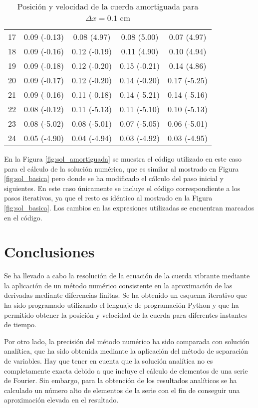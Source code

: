 \documentclass[11pt]{article}
\begin{document}
\begin{table}
\begin{small}
\begin{tabular}{ c c c c c }
17 & 0.09 (-0.13) & 0.08 (4.97) & 0.08 (5.00) & 0.07 (4.97) \\
18 & 0.09 (-0.16) & 0.12 (-0.19) & 0.11 (4.90) & 0.10 (4.94) \\
19 & 0.09 (-0.18) & 0.12 (-0.20) & 0.15 (-0.21) & 0.14 (4.86) \\
20 & 0.09 (-0.17) & 0.12 (-0.20) & 0.14 (-0.20) & 0.17 (-5.25) \\
21 & 0.09 (-0.16) & 0.11 (-0.18) & 0.14 (-5.21) & 0.14 (-5.16) \\
22 & 0.08 (-0.12) & 0.11 (-5.13) & 0.11 (-5.10) & 0.10 (-5.13) \\
23 & 0.08 (-5.02) & 0.08 (-5.01) & 0.07 (-5.05) & 0.06 (-5.01) \\
24 & 0.05 (-4.90) & 0.04 (-4.94) & 0.03 (-4.92) & 0.03 (-4.95) \\
\end{tabular}
\end{small}
\caption{Posición y velocidad de la cuerda amortiguada para $\Delta{x} = 0.1$ cm}
\label{tab:est_velocidad_amortiguado}
\end{table}

En la Figura \ref{fig:sol_amortiguada} se muestra el código utilizado en este caso para el
cálculo de la solución numérica, que es similar al mostrado en Figura \ref{fig:sol_basica}
pero donde se ha modificado el cálculo del paso inicial y siguientes. En este caso
únicamente se incluye el código correspondiente a los pasos iterativos, ya que el resto
es idéntico al mostrado en la Figura \ref{fig:sol_basica}. Los cambios en las expresiones
utilizadas se encuentran marcados en el código.

\section{Conclusiones}
Se ha llevado a cabo la resolución de la ecuación de la cuerda vibrante mediante la
aplicación de un método numérico consistente en la aproximación de las derivadas mediante
diferencias finitas. Se ha obtenido un esquema iterativo que ha sido programado utilizando
el lenguaje de programación Python y que ha permitido obtener la posición y velocidad de
la cuerda para diferentes instantes de tiempo.

Por otro lado, la precisión del método numérico ha sido comparada con solución analítica,
que ha sido obtenida mediante la aplicación del método de separación de variables. Hay que
tener en cuenta que la solución analítica no es completamente exacta debido a que incluye
el cálculo de elementos de una serie de Fourier. Sin embargo, para la obtención de los
resultados analíticos se ha calculado un número alto de elementos de la serie con el fin
de conseguir una aproximación elevada en el resultado.
\end{document}
